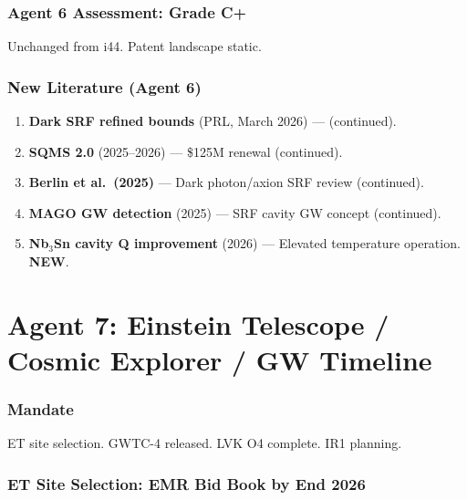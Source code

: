 \documentclass[11pt,a4paper]{article}
\newcommand{\NEW}{\textcolor{dfdblue}{\textbf{NEW}}}
\begin{document}
\section{Agent 6 Assessment: Grade C+}

Unchanged from i44. Patent landscape static.

\section{New Literature (Agent 6)}

\begin{enumerate}
\item \textbf{Dark SRF refined bounds} (PRL, March 2026) --- (continued).
\item \textbf{SQMS 2.0} (2025--2026) --- \$125M renewal (continued).
\item \textbf{Berlin et al.\ (2025)} --- Dark photon/axion SRF review (continued).
\item \textbf{MAGO GW detection} (2025) --- SRF cavity GW concept (continued).
\item \textbf{Nb$_3$Sn cavity Q improvement} (2026) --- Elevated temperature operation. \NEW.
\end{enumerate}


\part{Agent 7: Einstein Telescope / Cosmic Explorer / GW Timeline}
\label{part:agent7}

\section{Mandate}

ET site selection. GWTC-4 released. LVK O4 complete. IR1 planning.

\section{ET Site Selection: EMR Bid Book by End 2026}
\end{document}
